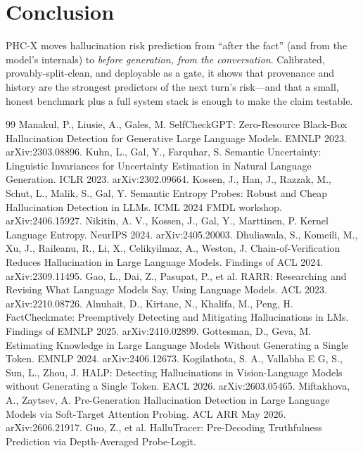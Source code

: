 \documentclass[conference,a4paper]{IEEEtran}
\begin{document}
\section{Conclusion}
PHC-X moves hallucination risk prediction from ``after the fact'' (and from
the model's internals) to \emph{before generation, from the conversation}.
Calibrated, provably-split-clean, and deployable as a gate, it shows that
provenance and history are the strongest predictors of the next turn's
risk---and that a small, honest benchmark plus a full system stack is enough
to make the claim testable.

\begin{thebibliography}{99}
 Manakul, P., Liusie, A., Gales,
M. SelfCheckGPT: Zero-Resource Black-Box Hallucination Detection for
Generative Large Language Models. EMNLP 2023. arXiv:2303.08896.
 Kuhn, L., Gal, Y., Farquhar, S.
Semantic Uncertainty: Linguistic Invariances for Uncertainty Estimation in
Natural Language Generation. ICLR 2023. arXiv:2302.09664.
 Kossen, J., Han, J.,
Razzak, M., Schut, L., Malik, S., Gal, Y. Semantic Entropy Probes: Robust
and Cheap Hallucination Detection in LLMs. ICML 2024 FMDL workshop.
arXiv:2406.15927.
 Nikitin, A. V., Kossen, J.,
Gal, Y., Marttinen, P. Kernel Language Entropy. NeurIPS 2024.
arXiv:2405.20003.
 Dhuliawala, S., Komeili, M., Xu, J.,
Raileanu, R., Li, X., Celikyilmaz, A., Weston, J. Chain-of-Verification
Reduces Hallucination in Large Language Models. Findings of ACL 2024.
arXiv:2309.11495.
 Gao, L., Dai, Z., Pasupat, P., et al.
RARR: Researching and Revising What Language Models Say, Using Language
Models. ACL 2023. arXiv:2210.08726.
 Alnuhait, D., Kirtane, N.,
Khalifa, M., Peng, H. FactCheckmate: Preemptively Detecting and Mitigating
Hallucinations in LMs. Findings of EMNLP 2025. arXiv:2410.02899.
 Gottesman, D., Geva, M. Estimating
Knowledge in Large Language Models Without Generating a Single Token.
EMNLP 2024. arXiv:2406.12673.
 Kogilathota, S. A., Vallabha E G,
S., Sun, L., Zhou, J. HALP: Detecting Hallucinations in Vision-Language
Models without Generating a Single Token. EACL 2026. arXiv:2603.05465.
 Miftakhova, A.,
Zaytsev, A. Pre-Generation Hallucination Detection in Large Language Models
via Soft-Target Attention Probing. ACL ARR May 2026. arXiv:2606.21917.
 Guo, Z., et al. HalluTracer:
Pre-Decoding Truthfulness Prediction via Depth-Averaged Probe-Logit.

\end{thebibliography}
\end{document}
